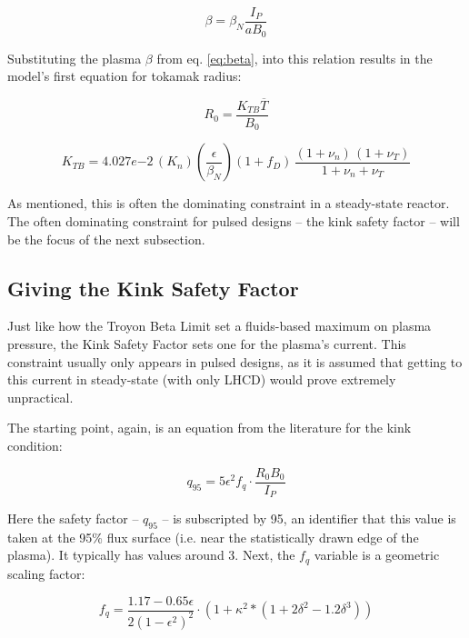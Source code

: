 \begin{equation}
	\beta = \beta_N \frac{ I_P }{ a B_0 }
\end{equation}

Substituting the plasma $\beta$ from eq. \ref{eq:beta}, into this relation results in the model's first equation for tokamak radius:

\begin{equation}
  R_0 = \frac{ K_{TB} \overline{T} }{ B_0 }
\end{equation}

\begin{equation}
  K_{TB} = 4.027e{-2} \, ( K_n ) \left( \frac{\epsilon}{\beta_N} \right)  ( 1 + f_D ) \, \frac{ (1 + \nu_n) \, (1 + \nu_T) }{1 + \nu_n + \nu_T }
\end{equation}

As mentioned, this is often the dominating constraint in a steady-state reactor. The often dominating constraint for pulsed designs -- the kink safety factor -- will be the focus of the next subsection.

\subsection{Giving the Kink Safety Factor}

Just like how the Troyon Beta Limit set a fluids-based maximum on plasma pressure, the Kink Safety Factor sets one for the plasma's current. This constraint usually only appears in pulsed designs, as it is assumed that getting to this current in steady-state (with only LHCD) would prove extremely unpractical.

The starting point, again, is an equation from the literature for the kink condition:

\begin{equation}
	q_{95} = 5 \epsilon^2 f_q \cdot  \frac{ R_0 B_0 }{ I_P }
\end{equation}

Here the safety factor -- $q_{95}$ -- is subscripted by 95, an identifier that this value is taken at the 95\% flux surface (i.e. near the statistically drawn edge of the plasma). It typically has values around 3. Next, the $f_q$ variable is a geometric scaling factor:

\begin{equation}
  f_q = \frac{1.17 - 0.65 \epsilon}{2 ( 1 - \epsilon^2 )^2} \cdot  \left( 1 + \kappa^2 * ( 1 + 2 \delta^2 - 1.2 \delta^3 ) \right)
\end{equation}

